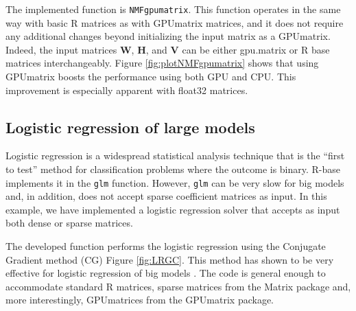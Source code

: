 The implemented function is \texttt{NMFgpumatrix}. This function operates in the same way with basic R matrices as with GPUmatrix matrices, and it does not require any additional changes beyond initializing the input matrix as a GPUmatrix. Indeed, the input matrices \textbf{W}, \textbf{H}, and \textbf{V} can be either gpu.matrix or R base matrices interchangeably. Figure \ref{fig:plotNMFgpumatrix} shows that using GPUmatrix boosts the performance using both GPU and CPU. This improvement is especially apparent with float32 matrices.

\hypertarget{logistic-regression-of-large-models}{%
\subsection{Logistic regression of large models}\label{logistic-regression-of-large-models}}

Logistic regression is a widespread statistical analysis technique that is the ``first to test'' method for classification problems where the outcome is binary. R-base implements it in the \texttt{glm} function. However, \texttt{glm} can be very slow for big models and, in addition, does not accept sparse coefficient matrices as input. In this example, we have implemented a logistic regression solver that accepts as input both dense or sparse matrices.

The developed function performs the logistic regression using the Conjugate Gradient method (CG) Figure \ref{fig:LRGC}. This method has shown to be very effective for logistic regression of big models \citep{minka2003comparison}. The code is general enough to accommodate standard R matrices, sparse matrices from the Matrix package and, more interestingly, GPUmatrices from the GPUmatrix package.

